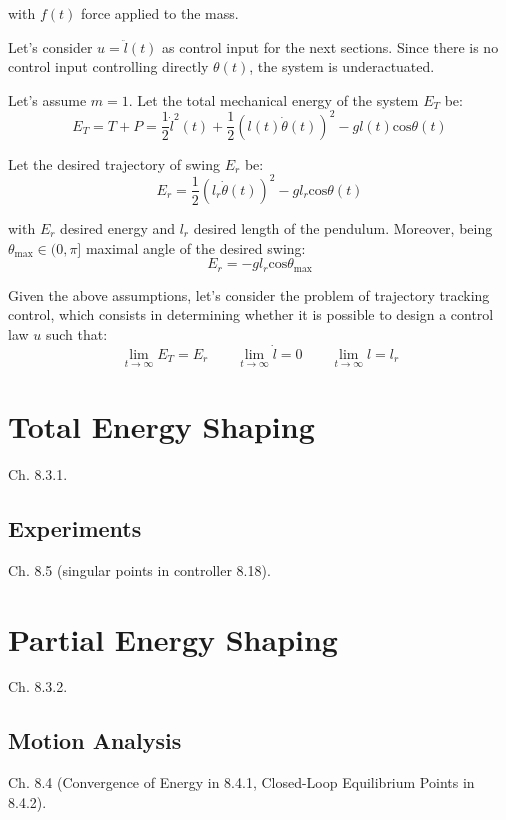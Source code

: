 \documentclass[a4paper]{article}
\begin{document}
\noindent with $f(t)$ force applied to the mass.

Let's consider $u = \ddot{l}(t)$ as control input for the next sections. Since 
there is no control input controlling directly $\theta(t)$, the system is
underactuated.

Let's assume $m=1$. Let the total mechanical energy of the system $E_T$ be:
\begin{equation}
  E_T = T + P
      = \frac{1}{2}\dot{l}^2(t) + \frac{1}{2}(l(t)\dot{\theta}(t))^2
        - g l(t) \text{cos}\theta(t)
\end{equation}

Let the desired trajectory of swing $E_r$ be:
\begin{equation}
  E_r = \frac{1}{2}(l_r \dot{\theta}(t))^2 - g l_r \text{cos} \theta(t)
\end{equation}

\noindent with $E_r$ desired energy and $l_r$ desired length of the pendulum.
Moreover, being $\theta_{\text{max}} \in (0, \pi]$ maximal angle of the desired swing:
\begin{equation}
  E_r = -g l_r \text{cos}\theta_{\text{max}}
\end{equation}

Given the above assumptions, let's consider the problem of trajectory tracking
control, which consists in determining whether it is possible to design a
control law $u$ such that:
\begin{equation}
  \lim_{t\to\infty} E_T = E_r \qquad
  \lim_{t\to\infty} \dot{l} = 0 \qquad
  \lim_{t\to\infty} l = l_r 
\end{equation}

\section{Total Energy Shaping}
Ch. 8.3.1.

\subsection{Experiments}
Ch. 8.5 (singular points in controller 8.18).

\section{Partial Energy Shaping}
Ch. 8.3.2.

\subsection{Motion Analysis}
Ch. 8.4 (Convergence of Energy in 8.4.1, Closed-Loop Equilibrium Points in
8.4.2).
\end{document}
